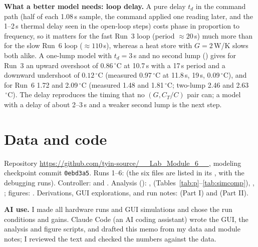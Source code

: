 \documentclass[reprint, amsmath, amssymb, aps, floatfix]{revtex4-2}
\newcommand{\degC}{\,^\circ\mathrm{C}}
\begin{document}
\textbf{What a better model needs: loop delay.} A pure delay $t_d$ in the command path
(half of each 1.08\,s sample, the command applied one reading later, and the 1--2\,s thermal
delay seen in the open-loop steps) costs phase in proportion to frequency, so it matters for
the fast Run~3 loop (period $\approx 20$\,s) much more than for the slow Run~6 loop
($\approx 110$\,s), whereas a heat store with $G = 2$\,W/K slows both alike. A one-lump model
with $t_d = 3$\,s and no second lump () gives for
Run~3 an upward overshoot of $0.86\degC$ at 10.7\,s with a 17\,s period and a downward
undershoot of $0.12\degC$ (measured 0.97$\degC$ at 11.8\,s, 19\,s, 0.09$\degC$), and for Run~6
1.72 and 2.09$\degC$ (measured 1.48 and 1.81$\degC$; two-lump 2.46 and 2.63$\degC$). The delay
reproduces the timing that no $(G, C_T/C)$ pair can; a model with a delay of about 2--3\,s
and a weaker second lump is the next step.

\section*{Data and code}

{\footnotesize\raggedright
Repository \url{https://github.com/tyin-source/__Lab_Module_6__}, modeling checkpoint
commit \texttt{0ebd3a5}. Runs 1--6:  (the six files are listed in its
, with the debugging runs). Controller:  and
. Analysis ():
, 
(Tables~\ref{tab:p}--\ref{tab:simcomp}), ,
; figures: .
Derivations, GUI explorations, and run notes: 
(Part I) and  (Part II).

\textbf{AI use.} I made all hardware runs and GUI simulations and chose the run conditions
and gains. Claude Code (an AI coding assistant) wrote the GUI, the analysis and figure
scripts, and drafted this memo from my data and module notes; I reviewed the text and checked
the numbers against the data.
\par}
\end{document}
